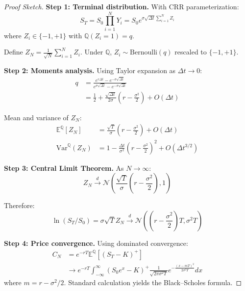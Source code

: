 \documentclass[10pt,twocolumn]{article}
\begin{document}
\begin{proof}[Proof Sketch]
\textbf{Step 1: Terminal distribution.} With CRR parameterization:
\begin{equation}
S_T = S_0 \prod_{i=1}^N Y_i = S_0 e^{\sigma\sqrt{\Delta t}\sum_{i=1}^N Z_i}
\end{equation}
where $Z_i \in \{-1, +1\}$ with $\mathbb{Q}(Z_i = 1) = q$.

Define $Z_N = \frac{1}{\sqrt{N}}\sum_{i=1}^N Z_i$. Under $\mathbb{Q}$, $Z_i \sim \text{Bernoulli}(q)$ rescaled to $\{-1, +1\}$.

\textbf{Step 2: Moments analysis.} Using Taylor expansion as $\Delta t \to 0$:
\begin{align}
q &= \frac{e^{r\Delta t} - e^{-\sigma\sqrt{\Delta t}}}{e^{\sigma\sqrt{\Delta t}} - e^{-\sigma\sqrt{\Delta t}}}\\
  &= \frac{1}{2} + \frac{\sqrt{\Delta t}}{2\sigma}\left(r - \frac{\sigma^2}{2}\right) + O(\Delta t)
\end{align}

Mean and variance of $Z_N$:
\begin{align}
\mathbb{E}^\mathbb{Q}[Z_N] &= \frac{\sqrt{T}}{\sigma}\left(r - \frac{\sigma^2}{2}\right) + O(\Delta t)\\
\text{Var}^\mathbb{Q}(Z_N) &= 1 - \frac{\Delta t}{\sigma^2}\left(r - \frac{\sigma^2}{2}\right)^2 + O(\Delta t^{3/2})
\end{align}

\textbf{Step 3: Central Limit Theorem.} As $N \to \infty$:
\begin{equation}
Z_N \xrightarrow{d} \mathcal{N}\left(\frac{\sqrt{T}}{\sigma}\left(r - \frac{\sigma^2}{2}\right), 1\right)
\end{equation}

Therefore:
\begin{equation}
\ln(S_T/S_0) = \sigma\sqrt{T} Z_N \xrightarrow{d} \mathcal{N}\left(\left(r - \frac{\sigma^2}{2}\right)T, \sigma^2 T\right)
\end{equation}

\textbf{Step 4: Price convergence.} Using dominated convergence:
\begin{align}
C_N &= e^{-rT}\mathbb{E}^\mathbb{Q}[(S_T - K)^+]\\
    &\to e^{-rT}\int_{-\infty}^\infty (S_0 e^x - K)^+ \frac{1}{\sqrt{2\pi\sigma^2 T}}e^{-\frac{(x-mT)^2}{2\sigma^2T}}dx
\end{align}
where $m = r - \sigma^2/2$. Standard calculation yields the Black--Scholes formula.
\end{proof}
\end{document}
